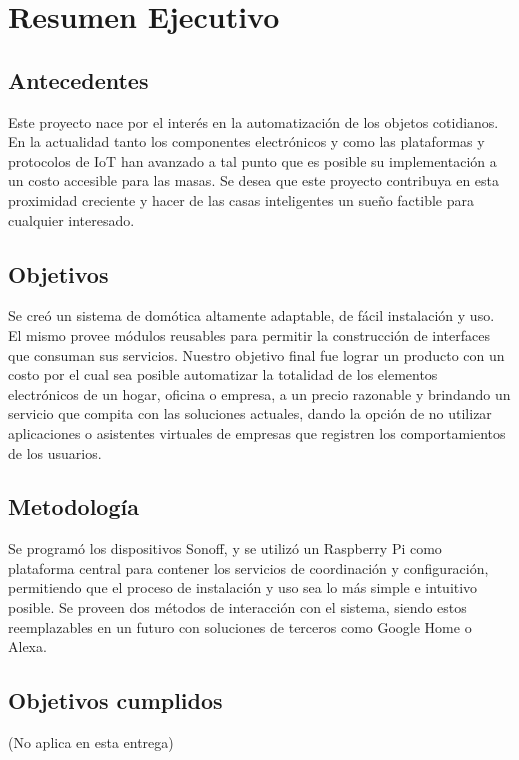 \chapter{Resumen Ejecutivo}

\section{Antecedentes}

Este proyecto nace por el interés en la automatización de los objetos cotidianos. En la actualidad tanto los componentes electrónicos y como las plataformas y protocolos de IoT han avanzado a tal punto que es posible su implementación a un costo accesible para las masas. Se desea que este proyecto contribuya en esta proximidad creciente y hacer de las casas inteligentes un sueño factible para cualquier interesado.

\section{Objetivos}

Se creó un sistema de domótica altamente adaptable, de fácil instalación y uso. El mismo provee módulos reusables para permitir la construcción de interfaces que consuman sus servicios. Nuestro objetivo final fue lograr un producto con un costo por el cual sea posible automatizar la totalidad de los elementos electrónicos de un hogar, oficina o empresa, a un precio razonable y brindando un servicio que compita con las soluciones actuales, dando la opción de no utilizar aplicaciones o asistentes virtuales de empresas que registren los comportamientos de los usuarios.

\section{Metodología}

Se programó los dispositivos Sonoff, y se utilizó un Raspberry Pi como plataforma central para contener los servicios de coordinación y configuración, permitiendo que el proceso de instalación y uso sea lo más simple e intuitivo posible. Se proveen dos métodos de interacción con el sistema, siendo estos reemplazables en un futuro con soluciones de terceros como Google Home o Alexa. 

\section{Objetivos cumplidos}

(No aplica en esta entrega)